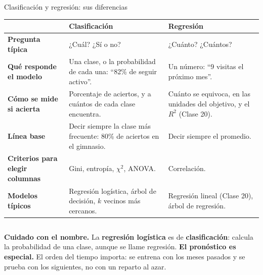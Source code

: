\documentclass[aspectratio=169,11pt]{beamer}
\begin{document}
\begin{frame}[t]{Clasificación y regresión: sus diferencias}
  \footnotesize
  \renewcommand{\arraystretch}{1.05}
  \begin{tabular}{@{}L{2.9cm}L{5.1cm}L{5.1cm}@{}}
    \toprule
    & \textbf{Clasificación} & \textbf{Regresión} \\
    \midrule
    \textbf{Pregunta típica} & ¿Cuál? ¿Sí o no? & ¿Cuánto? ¿Cuántos? \\
    \textbf{Qué responde el modelo} & Una clase, o la probabilidad de cada una: ``82\% de seguir activo''. & Un número: ``9 visitas el próximo mes''. \\
    \textbf{Cómo se mide si acierta} & Porcentaje de aciertos, y a cuántos de cada clase encuentra. & Cuánto se equivoca, en las unidades del objetivo, y el $R^2$ (Clase 20). \\
    \textbf{Línea base} & Decir siempre la clase más frecuente: 80\% de aciertos en el gimnasio. & Decir siempre el promedio. \\
    \textbf{Criterios para elegir columnas} & Gini, entropía, $\chi^2$, ANOVA. & Correlación. \\
    \textbf{Modelos típicos} & Regresión logística, árbol de decisión, $k$ vecinos más cercanos. & Regresión lineal (Clase 20), árbol de regresión. \\
    \bottomrule
  \end{tabular}
  \vspace{0.1cm}

  \begin{columns}[T,onlytextwidth]
    \scriptsize{\color{esumerOrange}\textbf{Cuidado con el nombre.}} La
    \textbf{regresión logística} es de \textbf{clasificación}: calcula la
    probabilidad de una clase, aunque se llame regresión.
    \scriptsize{\color{esumerNavy}\textbf{El pronóstico es especial.}} El
    orden del tiempo importa: se entrena con los meses pasados y se prueba
    con los siguientes, no con un reparto al azar.
  \end{columns}
\end{frame}
\end{document}
